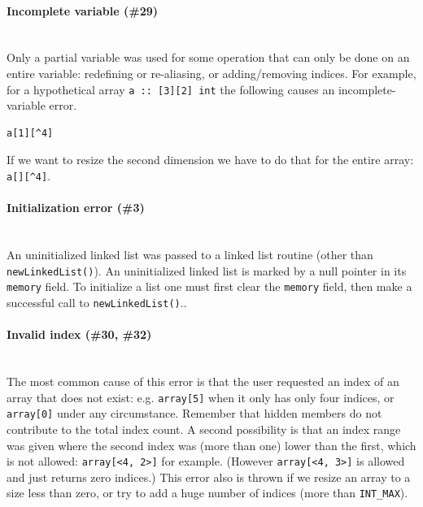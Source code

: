 \documentclass{article}
\newenvironment{code}{
       \begin{list}{}{
               \setlength{\leftmargin}{.4in}
               \setlength{\rightmargin}{0in}
               \setlength{\topsep}{.2in}
       }
       \small
       \item[] }
       { \end{list}   }
\begin{document}
\paragraph{Incomplete variable (\#29)\\\\}

Only a partial variable was used for some operation that can only be done on an entire variable:  redefining or re-aliasing, or adding/removing indices.  For example, for a hypothetical array \verb#a :: [3][2] int# the following causes an incomplete-variable error.

\begin{code} \begin{verbatim}
a[1][^4]
\end{verbatim} \end{code}

\noindent If we want to resize the second dimension we have to do that for the entire array:  \verb#a[][^4]#.\\




\paragraph{Initialization error (\#3)\\\\}

An uninitialized linked list was passed to a linked list routine (other than \texttt{newLinkedList()}).  An uninitialized linked list is marked by a null pointer in its \texttt{memory} field.  To initialize a list one must first clear the \verb#memory# field, then make a successful call to \texttt{newLinkedList()}..\\




\paragraph{Invalid index (\#30, \#32)\\\\}

The most common cause of this error is that the user requested an index of an array that does not exist:  e.g. \verb#array[5]# when it only has only four indices, or \verb#array[0]# under any circumstance.  Remember that hidden members do not contribute to the total index count.  A second possibility is that an index range was given where the second index was (more than one) lower than the first, which is not allowed:  \verb#array[<4, 2>]# for example.  (However \verb#array[<4, 3>]# is allowed and just returns zero indices.)  This error also is thrown if we resize an array to a size less than zero, or try to add a huge number of indices (more than \verb#INT_MAX#).
\end{document}
